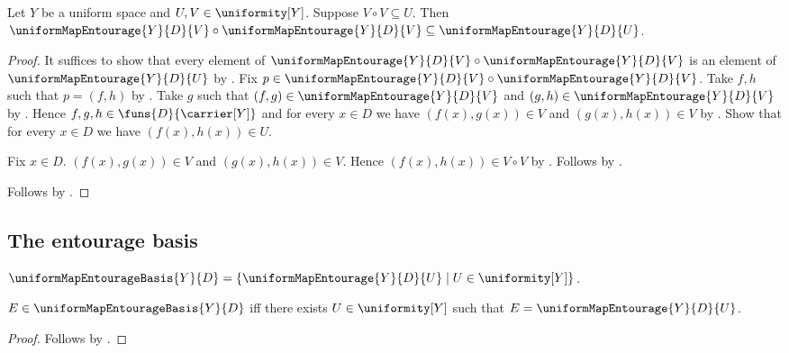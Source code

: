 \begin{proposition}\label{uniform_map_entourage_square}
    Let $Y$ be a uniform space and $U,V\in\uniformity[Y]$.
    Suppose $V\circ V\subseteq U$.
    Then $\uniformMapEntourage{Y}{D}{V}\circ
            \uniformMapEntourage{Y}{D}{V}
        \subseteq\uniformMapEntourage{Y}{D}{U}$.
\end{proposition}
\begin{proof}
    It suffices to show that every element of
        $\uniformMapEntourage{Y}{D}{V}\circ
            \uniformMapEntourage{Y}{D}{V}$ is an element of
        $\uniformMapEntourage{Y}{D}{U}$ by .
    Fix $p\in\uniformMapEntourage{Y}{D}{V}\circ
        \uniformMapEntourage{Y}{D}{V}$.
    Take $f,h$ such that $p=(f,h)$ by .
    Take $g$ such that $(f,g)\in\uniformMapEntourage{Y}{D}{V}$ and
        $(g,h)\in\uniformMapEntourage{Y}{D}{V}$ by .
    Hence $f,g,h\in\funs{D}{\carrier[Y]}$ and for every $x\in D$ we have
        $(f(x),g(x))\in V$ and $(g(x),h(x))\in V$ by
        .
    Show that for every $x\in D$ we have $(f(x),h(x))\in U$.
    \begin{subproof}
        Fix $x\in D$.
        $(f(x),g(x))\in V$ and $(g(x),h(x))\in V$.
        Hence $(f(x),h(x))\in V\circ V$ by .
        Follows by .
    \end{subproof}
    Follows by .
\end{proof}

\subsection{The entourage basis}

\begin{definition}\label{uniform_map_entourage_basis}
    $\uniformMapEntourageBasis{Y}{D}=
        \{\uniformMapEntourage{Y}{D}{U}\mid U\in\uniformity[Y]\}$.
\end{definition}

\begin{proposition}\label{uniform_map_entourage_basis_iff}
    $E\in\uniformMapEntourageBasis{Y}{D}$ iff there exists
        $U\in\uniformity[Y]$ such that
        $E=\uniformMapEntourage{Y}{D}{U}$.
\end{proposition}
\begin{proof}
    Follows by .
\end{proof}

